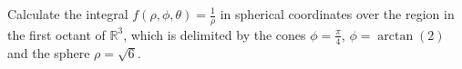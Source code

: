 Calculate the integral \( f(\rho, \phi, \theta) = \frac{1}{\rho} \) in spherical coordinates over the region in the first octant of \( \mathbb{R}^3 \), which is delimited by the cones \( \phi = \frac{\pi}{4} \), \( \phi = \arctan(2) \) and the sphere \( \rho = \sqrt{6} \).
